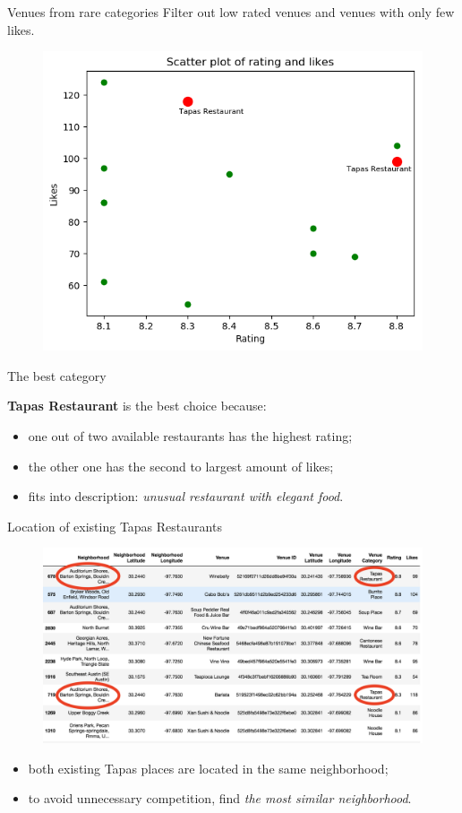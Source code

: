 \documentclass{beamer}
\begin{document}
    \begin{frame}{Venues from rare categories}
Filter out low rated venues and venues with only few likes.
     \begin{figure}[H]
	\centering
	\includegraphics[width=.8\textwidth]{pics/ratings_and_likes}
\end{figure}
  \end{frame}
    \begin{frame}{The best category}
    \begin{center}
{\bf Tapas Restaurant} is the best choice because:
 \end{center}
\begin{itemize}
\item[\EightStarTaper] one out of two available restaurants has the highest rating;
\item[\EightStarTaper] the other one has the second to largest amount of likes;
\item[\EightStarTaper] fits into description: {\it unusual restaurant with elegant food}.
\end{itemize}
  \end{frame}
    \begin{frame}{Location of existing Tapas Restaurants}
\begin{figure}[H]
	\centering
	\includegraphics[width=.9\textwidth]{pics/top_10_rare}
\end{figure}
    \begin{itemize}
    \item[\EightStarTaper] both existing Tapas places are located in the same neighborhood;
    \item[\EightStarTaper] to avoid unnecessary competition, find {\it the most similar neighborhood}.
      \end{itemize}
  \end{frame}
\end{document}
